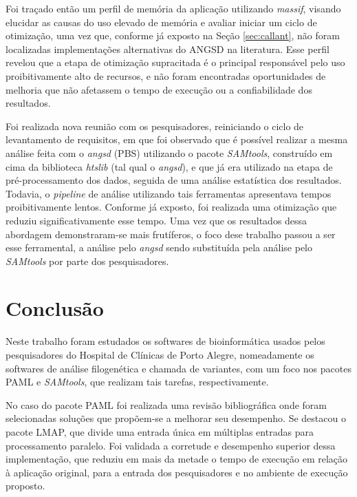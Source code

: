\documentclass[cic,tc]{iiufrgs}
\begin{document}
Foi traçado então um perfil de memória da aplicação utilizando \textit{massif}, visando
elucidar as causas do uso elevado de memória e avaliar iniciar um ciclo de
otimização, uma vez que, conforme já exposto na Seção \ref{sec:callant}, não
foram localizadas implementações alternativas do ANGSD na literatura. Esse
perfil revelou que a etapa de otimização supracitada é o principal responsável
pelo uso proibitivamente alto de recursos, e não foram encontradas
oportunidades de melhoria que não afetassem o tempo de execução ou a
confiabilidade dos resultados.

Foi realizada nova reunião com os pesquisadores, reiniciando o ciclo de
levantamento de requisitos, em que foi observado que é possível realizar a mesma
análise feita com o \textit{angsd} (PBS) utilizando o pacote \textit{SAMtools}, construído em
cima da biblioteca \textit{htslib} (tal qual o \textit{angsd}), e que já era utilizado na etapa
de pré-processamento dos dados, seguida de uma análise estatística dos
resultados. Todavia, o \textit{pipeline} de análise utilizando tais ferramentas
apresentava tempos proibitivamente lentos. Conforme já exposto, foi realizada
uma otimização que reduziu significativamente esse tempo. Uma vez que os
resultados dessa abordagem demonstraram-se mais frutíferos, o foco dese
trabalho passou a ser esse ferramental, a análise pelo \textit{angsd} sendo substituída
pela análise pelo \textit{SAMtools} por parte dos pesquisadores.

%
%
%
%
\chapter{Conclusão}
\label{chap:conc}

Neste trabalho foram estudados os softwares de bioinformática usados pelos
pesquisadores do Hospital de Clínicas de Porto Alegre, nomeadamente os
softwares de análise filogenética e chamada de variantes, com um foco nos
pacotes PAML e \textit{SAMtools}, que realizam tais tarefas, respectivamente.

No caso do pacote PAML foi realizada uma revisão bibliográfica onde foram
selecionadas soluções que propõem-se a melhorar seu desempenho. Se destacou o
pacote LMAP, que divide uma entrada única em múltiplas entradas para
processamento paralelo. Foi validada a corretude e desempenho superior dessa
implementação, que reduziu em mais da metade o tempo de execução em relação à
aplicação original, para a entrada dos pesquisadores e no ambiente de execução
proposto.
\end{document}
